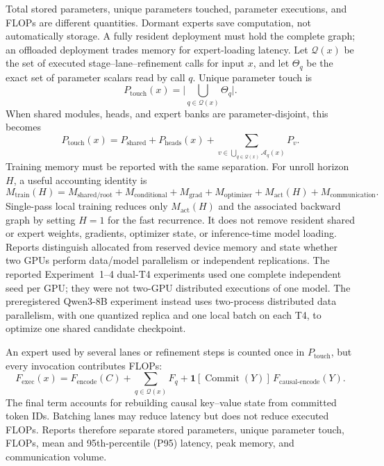 \documentclass[10pt,a4paper]{article}
\newcommand{\op}[1]{\operatorname{#1}}
\newcommand{\ind}[1]{\mathbf{1}\!\left[#1\right]}
\newcommand{\Acal}{\mathcal{A}}
\newcommand{\Qcal}{\mathcal{Q}}
\begin{document}
Total stored parameters, unique parameters touched, parameter executions, and
FLOPs are different quantities. Dormant experts save computation, not
automatically storage. A fully resident deployment must hold the complete
graph; an offloaded deployment trades memory for expert-loading latency. Let
$\Qcal(x)$ be the set of executed stage--lane--refinement calls for input $x$,
and let $\Theta_q$ be the exact set of parameter scalars read by call $q$.
Unique parameter touch is
\begin{equation}
P_{\mathrm{touch}}(x) = \Biggl| \bigcup_{q \in \Qcal(x)} \Theta_q \Biggr|.
\end{equation}
When shared modules, heads, and expert banks are parameter-disjoint, this
becomes
\begin{equation}
P_{\mathrm{touch}}(x) = P_{\mathrm{shared}} + P_{\mathrm{heads}}(x)
+ \sum_{v \in \bigcup_{q \in \Qcal(x)} \Acal_q(x)} P_v .
\end{equation}
Training memory must be reported with the same separation. For unroll horizon
$H$, a useful accounting identity is
\begin{equation}
M_{\mathrm{train}}(H) = M_{\mathrm{shared/root}} + M_{\mathrm{conditional}}
+ M_{\mathrm{grad}} + M_{\mathrm{optimizer}} + M_{\mathrm{act}}(H)
+ M_{\mathrm{communication}} .
\end{equation}
Single-pass local training reduces only $M_{\mathrm{act}}(H)$ and the
associated backward graph by setting $H = 1$ for the fast recurrence. It does
not remove resident shared or expert weights, gradients, optimizer state, or
inference-time model loading. Reports distinguish allocated from reserved
device memory and state whether two GPUs perform data/model parallelism or
independent replications. The reported Experiment~1--4 dual-T4 experiments used one
complete independent seed per GPU; they were not two-GPU distributed
executions of one model. The preregistered Qwen3-8B experiment instead uses
two-process distributed data parallelism, with one quantized replica and one
local batch on each T4, to optimize one shared candidate checkpoint.

An expert used by several lanes or refinement steps is counted once in
$P_{\mathrm{touch}}$, but every invocation contributes FLOPs:
\begin{equation}
F_{\mathrm{exec}}(x) = F_{\mathrm{encode}}(C)
+ \sum_{q \in \Qcal(x)} F_q
+ \ind{\op{Commit}(Y)}\, F_{\mathrm{causal\text{-}encode}}(Y).
\end{equation}
The final term accounts for rebuilding causal key--value state from committed
token IDs. Batching lanes may reduce latency but does not reduce executed
FLOPs. Reports therefore separate stored parameters, unique parameter touch,
FLOPs, mean and 95th-percentile (P95) latency, peak memory, and communication
volume.
\end{document}
